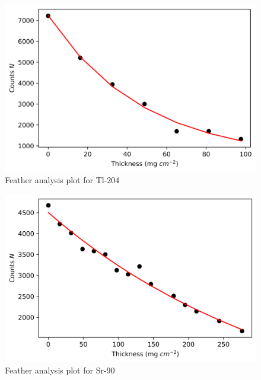 \documentclass[%
 reprint,
nofootinbib,
 amsmath,amssymb,
 aps,
floatfix,
]{revtex4-2}
\begin{document}
        \begin{figure}
            \centering
            \includegraphics[scale = 0.63]{Figures/plot-feather-1.png}
            \caption{Feather analysis plot for Tl-204}
            \label{fig:feather-1}
        \end{figure}
        \begin{figure}
            \centering
            \includegraphics[scale = 0.63]{Figures/plot-feather-2.png}
            \caption{Feather analysis plot for Sr-90}
            \label{fig:feather-2}
        \end{figure}
\end{document}
